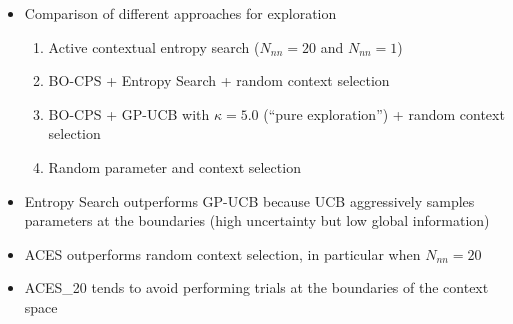 \begin{block}{}
\begin{itemize}
 \item Comparison of different approaches for exploration
 \begin{enumerate}
  \item Active contextual entropy search ($N_{nn} = 20$ and $N_{nn} = 1$)
  \item BO-CPS + Entropy Search +  random context selection
  \item BO-CPS + GP-UCB with $\kappa=5.0$ (``pure exploration'') + random context selection
  \item Random parameter and context selection
 \end{enumerate}
 \item Entropy Search outperforms GP-UCB because UCB aggressively samples parameters at the boundaries (high uncertainty but low global information)
 \item ACES outperforms random context selection, in particular when $N_{nn} = 20$
 \item ACES\_20 tends to avoid performing trials at the boundaries of the context space
\end{itemize}

\end{block}